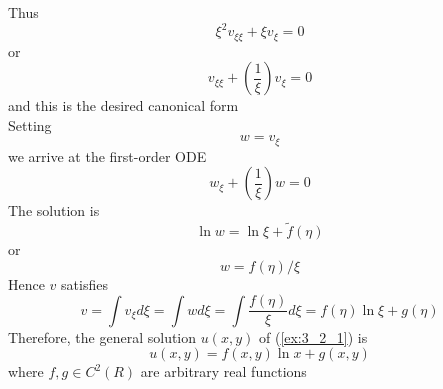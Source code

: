 \documentclass[11pt]{report}
\newcommand{\sps}{\\[0.2cm]}
\begin{document}
	Thus
	\begin{equation}
		\xi^2v_{\xi\xi} + \xi v_\xi = 0\label{ex:3_2_6}\tag{6}
	\end{equation}
	or
	\begin{equation}
		v_{\xi\xi} + \left(\frac{1}{\xi}\right)v_\xi = 0\label{ex:3_2_7}\tag{7}
	\end{equation}
	and this is the desired canonical form\sps
	Setting 
	\begin{equation}
		w = v_{\xi}\label{ex:3_2_8}\tag{8}
	\end{equation}
	we arrive at the first-order ODE
	\begin{equation}
		w_\xi + \left(\frac{1}{\xi}\right)w=0\label{ex:3_2_9}\tag{9}
	\end{equation}
	The solution is
	\begin{equation}
		\ln w = \ln \xi + \widetilde{f}(\eta)\label{ex:3_2_10}\tag{10}
	\end{equation}
	or
	\begin{equation}
		w = f(\eta)/\xi\label{ex:3_2_11}\tag{11}
	\end{equation}
	Hence $v$ satisfies
	\begin{equation}
		v = \int v_\xi d\xi = \int w d\xi = \int \frac{f(\eta)}{\xi}d\xi = f(\eta)\ln\xi + g(\eta)\label{ex:3_2_12}\tag{12}
	\end{equation}
	Therefore, the general solution $u(x,y)$ of (\ref{ex:3_2_1}) is
	\begin{equation}
		u(x,y) = f(x,y)\ln x + g(x,y)\label{ex:3_2_13}\tag{13}
	\end{equation}
	where $f,g \in C^2(R)$ are arbitrary real functions\sps
	{~}\sps
	
\end{document}
